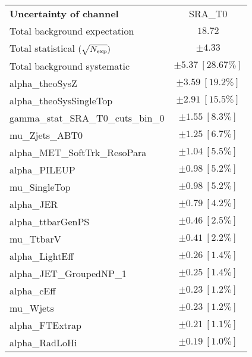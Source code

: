 
\begin{table}
\begin{center}
\setlength{\tabcolsep}{0.0pc}
\begin{tabular*}{\textwidth}{@{\extracolsep{\fill}}lc}
\noalign{\smallskip}\hline\noalign{\smallskip}
{\bf Uncertainty of channel}                                    & SRA\_T0            \\
\noalign{\smallskip}\hline\noalign{\smallskip}
Total background expectation             &  $18.72$       \\
\noalign{\smallskip}\hline\noalign{\smallskip}
Total statistical $(\sqrt{N_{\rm exp}})$              & $\pm 4.33$       \\
Total background systematic               & $\pm 5.37\ [28.67\%] $             \\
\noalign{\smallskip}\hline\noalign{\smallskip}
\noalign{\smallskip}\hline\noalign{\smallskip}
alpha\_theoSysZ         & $\pm 3.59\ [19.2\%] $       \\
alpha\_theoSysSingleTop         & $\pm 2.91\ [15.5\%] $       \\
gamma\_stat\_SRA\_T0\_cuts\_bin\_0         & $\pm 1.55\ [8.3\%] $       \\
mu\_Zjets\_ABT0         & $\pm 1.25\ [6.7\%] $       \\
alpha\_MET\_SoftTrk\_ResoPara         & $\pm 1.04\ [5.5\%] $       \\
alpha\_PILEUP         & $\pm 0.98\ [5.2\%] $       \\
mu\_SingleTop         & $\pm 0.98\ [5.2\%] $       \\
alpha\_JER         & $\pm 0.79\ [4.2\%] $       \\
alpha\_ttbarGenPS         & $\pm 0.46\ [2.5\%] $       \\
mu\_TtbarV         & $\pm 0.41\ [2.2\%] $       \\
alpha\_LightEff         & $\pm 0.26\ [1.4\%] $       \\
alpha\_JET\_GroupedNP\_1         & $\pm 0.25\ [1.4\%] $       \\
alpha\_cEff         & $\pm 0.23\ [1.2\%] $       \\
mu\_Wjets         & $\pm 0.23\ [1.2\%] $       \\
alpha\_FTExtrap         & $\pm 0.21\ [1.1\%] $       \\
alpha\_RadLoHi         & $\pm 0.19\ [1.0\%] $       \\

\end{tabular*}
\end{center}
\end{table}
